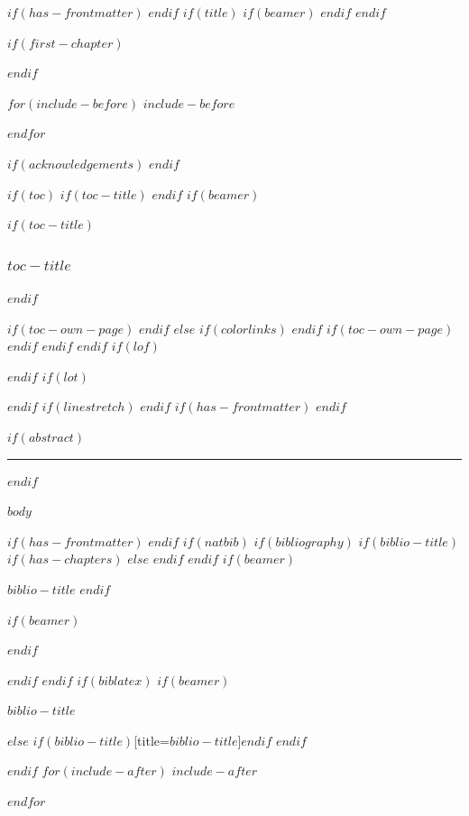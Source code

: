 \documentclass[
$if(fontsize)$
  $fontsize$,
$endif$
$if(papersize)$
  $papersize$paper,
$else$
  paper=a4,
$endif$
$if(beamer)$
  ignorenonframetext,
$if(handout)$
  handout,
$endif$
$if(aspectratio)$
  aspectratio=$aspectratio$,
$endif$
$endif$
$for(classoption)$
  $classoption$$sep$,
$endfor$
  ,captions=tableheading
]{$if(beamer)$$documentclass$$else$$if(book)$scrbook$else$scrartcl$endif$$endif$}
\newif\ifbibliography
\begin{document}

$if(has-frontmatter)$
\frontmatter
$endif$
$if(title)$
$if(beamer)$
\frame{\titlepage}
$endif$
$endif$

$if(first-chapter)$
\setcounter{chapter}{$first-chapter$}
\addtocounter{chapter}{-1}
$endif$

$for(include-before)$
$include-before$

$endfor$

$if(acknowledgements)$
\newpage
\newpage
$endif$

$if(toc)$
$if(toc-title)$
\renewcommand*\contentsname{$toc-title$}
$endif$
$if(beamer)$
\begin{frame}[allowframebreaks]
$if(toc-title)$
  \frametitle{$toc-title$}
$endif$
  \tableofcontents[hideallsubsections]
\end{frame}
$if(toc-own-page)$
\newpage
$endif$
$else$
{
$if(colorlinks)$
\hypersetup{linkcolor=$if(toccolor)$$toccolor$$else$$endif$}
$endif$
\setcounter{tocdepth}{$toc-depth$}
\tableofcontents
$if(toc-own-page)$
\newpage
$endif$
}
$endif$
$endif$
$if(lof)$
\listoffigures
$endif$
$if(lot)$
\listoftables
$endif$
$if(linestretch)$
$endif$
$if(has-frontmatter)$
\mainmatter
$endif$

$if(abstract)$
\begin{abstract}
  \justify {}
\end{abstract}
\par\noindent\rule{\textwidth}{0.4pt}
\newpage
$endif$

$body$

$if(has-frontmatter)$
\backmatter
$endif$
$if(natbib)$
$if(bibliography)$
$if(biblio-title)$
$if(has-chapters)$
\renewcommand\bibname{$biblio-title$}
$else$
\renewcommand\refname{$biblio-title$}
$endif$
$endif$
$if(beamer)$
\begin{frame}[allowframebreaks]{$biblio-title$}
  \bibliographytrue
$endif$
  
$if(beamer)$
\end{frame}
$endif$

$endif$
$endif$
$if(biblatex)$
$if(beamer)$
\begin{frame}[allowframebreaks]{$biblio-title$}
  \bibliographytrue
  \printbibliography[heading=none]
\end{frame}
$else$
\printbibliography$if(biblio-title)$[title=$biblio-title$]$endif$
$endif$

$endif$
$for(include-after)$
$include-after$

$endfor$
\end{document}
